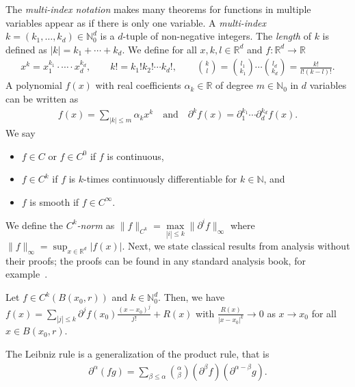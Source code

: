 The \emph{multi-index notation} makes many theorems for functions in multiple variables appear as if there is only one variable. A \emph{multi-index} \(k = (k_1, \ldots ,k_d) \in \mathbb{N}^d_0\) is a \(d\)-tuple of non-negative integers. The \emph{length} of \(k\) is defined as \(|k| = k_1 + \cdots + k_d\). We define for all \(x, k,l \in \mathbb{R}^d\) and \(f: \mathbb{R}^d \to \mathbb{R}\)
\begin{gather*}
    x^k = x_1^{k_1} \cdot \cdots \cdot x_d^{k_d}, \qquad
    k! = k_1! k_2! \cdots k_d!, \qquad
    \binom{k}{l} = \binom{l_1}{k_1} \cdots \binom{l_d}{k_d} = \frac{k!}{l! (k - l)!}.
\end{gather*}
A polynomial \(f(x)\) with real coefficients \(\alpha_k \in \mathbb{R}\) of degree \(m \in \mathbb{N}_0\) in \(d\) variables can be written as 
\begin{align*}
    f(x) = \sum\limits_{|k| \leq m} \alpha_{k}x^k  \quad \text{and} \quad
    \partial^k f(x) = \partial^{k_1}_{1} \cdots \partial^{k_d}_{d} f(x).
\end{align*}
We say 
\begin{itemize}
    \item \(f \in C\) or \(f \in C^0\) if \(f\) is continuous,
    \item \(f \in C^k\) if \(f\) is {\(k\)-times continuously differentiable} for \(k \in \mathbb{N}\), and
    \item \(f\) is {smooth} if \( f \in C^\infty \).
\end{itemize}
We define the \emph{\(C^k\)-norm} as \(\lVert f \rVert_{C^k} = \max\limits_{|i| \leq k} \lVert \partial^i f \rVert_{\infty}\) where \(\lVert f \rVert_{\infty} = \sup_{x \in \mathbb{R}^d} |f(x)|\). Next, we state classical results from analysis without their proofs; the proofs can be found in any standard analysis book, for example~\cite{MR0055409}.
\begin{theorem}
    Let \(f \in C^{k}(B(x_0, r))\) and \(k \in \mathbb{N}^d_0\). Then, we have \(f(x) = \sum\limits_{|j| \leq k}\partial^{j} f(x_0) \frac{{(x-x_0)}^j}{j!} + R(x)\) with \(\frac{R(x)}{|x-x_0|^{k}} \to 0\) as \(x \to x_0\) for all \(x \in B(x_0, r)\).
\end{theorem}

\begin{theorem}\label{theorem:leibniz}
    The Leibniz rule is a generalization of the product rule, that is
    \begin{align*}
        \partial^\alpha(fg) = \sum_{\beta \leq \alpha} \binom{\alpha}{\beta} (\partial^\beta f) (\partial^{\alpha - \beta} g).
    \end{align*}
\end{theorem}

